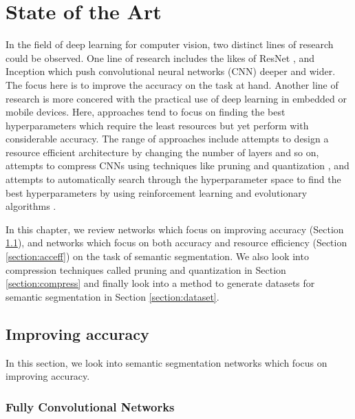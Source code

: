 
\chapter{State of the Art}

In the field of deep learning for computer vision, two distinct lines of research could be observed. One line of research includes the likes of ResNet \cite{DBLP:journals/corr/HeZRS15}, and Inception \cite{DBLP:journals/corr/SzegedyLJSRAEVR14} which push convolutional neural networks (CNN) deeper and wider. The focus here is to improve the accuracy on the task at hand. Another line of research is more concered with the practical use of deep learning in embedded or mobile devices. Here, approaches tend to focus on finding the best hyperparameters which require the least resources but yet perform with considerable accuracy. The range of approaches include attempts to design a resource efficient architecture by changing the number of layers and so on, attempts to compress CNNs using techniques like pruning \cite{DBLP:journals/corr/MolchanovTKAK16} and quantization \cite{DBLP:journals/corr/WuLWHC15}, and attempts to automatically search through the hyperparameter space to find the best hyperparameters by using reinforcement learning \cite{DBLP:journals/corr/ZophL16} and evolutionary algorithms \cite{DBLP:journals/corr/abs-1802-01548}. 

In this chapter, we review networks which focus on improving accuracy (Section \ref{section:impacc}), and networks which focus on both accuracy and resource efficiency (Section \ref{section:acceff}) on the task of semantic segmentation. We also look into compression techniques called pruning and quantization in Section \ref{section:compress} and finally look into a method to generate datasets for semantic segmentation in Section \ref{section:dataset}.


\section{Improving accuracy}
\label{section:impacc}

In this section, we look into semantic segmentation networks which focus on improving accuracy. 

\subsection{Fully Convolutional Networks}

